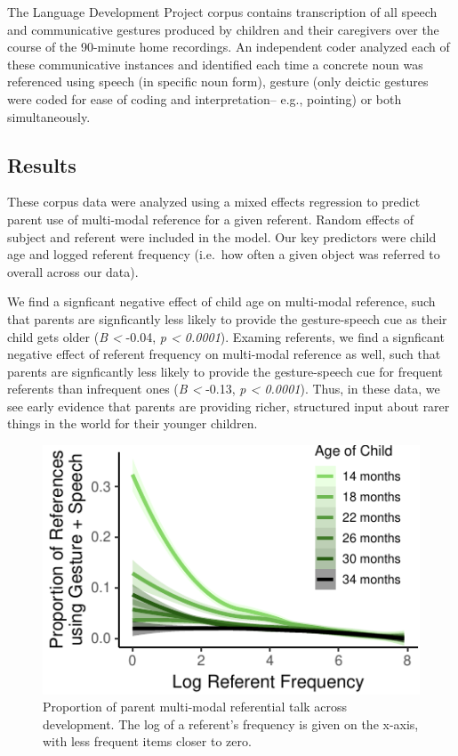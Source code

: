 \documentclass[10pt, letterpaper]{article}
\newenvironment{CodeChunk}{}{}
\begin{document}
The Language Development Project corpus contains transcription of all
speech and communicative gestures produced by children and their
caregivers over the course of the 90-minute home recordings. An
independent coder analyzed each of these communicative instances and
identified each time a concrete noun was referenced using speech (in
specific noun form), gesture (only deictic gestures were coded for ease
of coding and interpretation-- e.g., pointing) or both simultaneously.

\subsection{Results}\label{results}

These corpus data were analyzed using a mixed effects regression to
predict parent use of multi-modal reference for a given referent. Random
effects of subject and referent were included in the model. Our key
predictors were child age and logged referent frequency (i.e.~how often
a given object was referred to overall across our data).

We find a signficant negative effect of child age on multi-modal
reference, such that parents are signficantly less likely to provide the
gesture-speech cue as their child gets older (\emph{B \textless{}}
-0.04, \emph{p \textless{} 0.0001}). Examing referents, we find a
signficant negative effect of referent frequency on multi-modal
reference as well, such that parents are signficantly less likely to
provide the gesture-speech cue for frequent referents than infrequent
ones (\emph{B \textless{}} -0.13, \emph{p \textless{} 0.0001}). Thus, in
these data, we see early evidence that parents are providing richer,
structured input about rarer things in the world for their younger
children.

\begin{CodeChunk}
\begin{figure}[tb]

{\centering \includegraphics{figs/corpus_plot-1} 

}

\caption[Proportion of parent multi-modal referential talk across development]{Proportion of parent multi-modal referential talk across development. The log of a referent's frequency is given on the x-axis, with less frequent items closer to zero.}\label{fig:corpus_plot}
\end{figure}
\end{CodeChunk}
\end{document}
